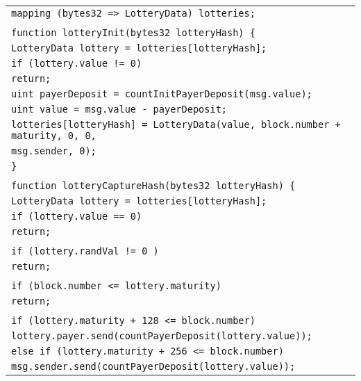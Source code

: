 \documentclass[a4paper]{article}
\begin{document}
\begin{tabularx}{\linewidth}{l}
        \qquad\texttt{mapping (bytes32 => LotteryData) lotteries;}\\
        \\
        \qquad\texttt{function lotteryInit(bytes32 lotteryHash) \{}\\
        \qquad\qquad\texttt{LotteryData lottery = lotteries[lotteryHash];}\\
        \qquad\qquad\texttt{if (lottery.value != 0)}\\
        \qquad\qquad\qquad\texttt{return;}\\
        \qquad\qquad\texttt{uint payerDeposit = countInitPayerDeposit(msg.value);}\\
        \qquad\qquad\texttt{uint value = msg.value - payerDeposit;}\\
        \qquad\qquad\texttt{lotteries[lotteryHash] = LotteryData(value, block.number + maturity, 0, 0,}\\
        \qquad\qquad\qquad\qquad\qquad\qquad\qquad\qquad\qquad\qquad\qquad\qquad\texttt{msg.sender, 0);}\\
        \qquad\texttt{\}}\\
        \\
        \qquad\texttt{function lotteryCaptureHash(bytes32 lotteryHash) \{}\\
        \qquad\qquad\texttt{LotteryData lottery = lotteries[lotteryHash];}\\
        \qquad\qquad\texttt{if (lottery.value == 0)}\\
        \qquad\qquad\qquad\texttt{return;}\\
        \\
        \qquad\qquad\texttt{if (lottery.randVal != 0 )}\\
        \qquad\qquad\qquad\texttt{return;}\\
        \\
        \qquad\qquad\texttt{if (block.number <= lottery.maturity)}\\
        \qquad\qquad\qquad\texttt{return;}\\
        \\
        \qquad\qquad\texttt{if (lottery.maturity + 128 <= block.number)}\\
        \qquad\qquad\qquad\texttt{lottery.payer.send(countPayerDeposit(lottery.value));}\\
        \qquad\qquad\texttt{else if~(lottery.maturity + 256 <= block.number)}\\
        \qquad\qquad\qquad\texttt{msg.sender.send(countPayerDeposit(lottery.value));}\\

\end{tabularx}
\end{document}
